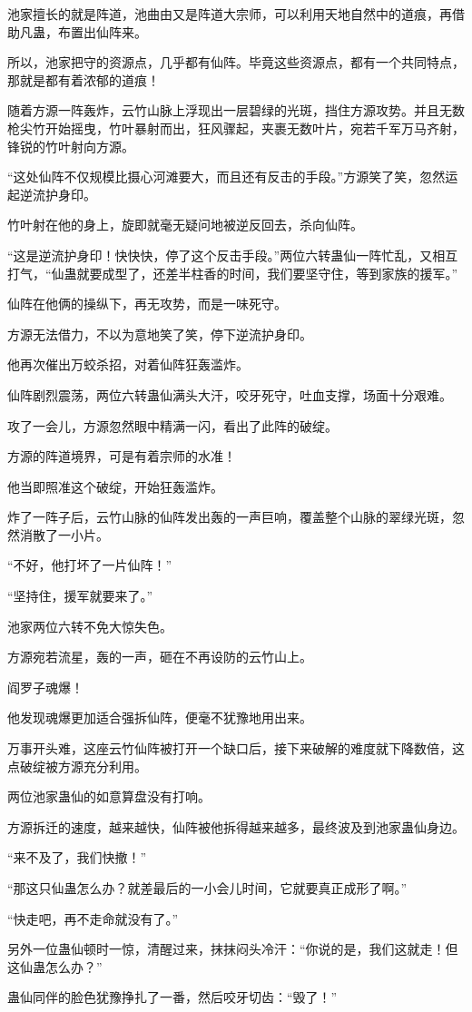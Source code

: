 \begin{this_body}
池家擅长的就是阵道，池曲由又是阵道大宗师，可以利用天地自然中的道痕，再借助凡蛊，布置出仙阵来。

所以，池家把守的资源点，几乎都有仙阵。毕竟这些资源点，都有一个共同特点，那就是都有着浓郁的道痕！

随着方源一阵轰炸，云竹山脉上浮现出一层碧绿的光斑，挡住方源攻势。并且无数枪尖竹开始摇曳，竹叶暴射而出，狂风骤起，夹裹无数叶片，宛若千军万马齐射，锋锐的竹叶射向方源。

“这处仙阵不仅规模比摄心河滩要大，而且还有反击的手段。”方源笑了笑，忽然运起逆流护身印。

竹叶射在他的身上，旋即就毫无疑问地被逆反回去，杀向仙阵。

“这是逆流护身印！快快快，停了这个反击手段。”两位六转蛊仙一阵忙乱，又相互打气，“仙蛊就要成型了，还差半柱香的时间，我们要坚守住，等到家族的援军。”

仙阵在他俩的操纵下，再无攻势，而是一味死守。

方源无法借力，不以为意地笑了笑，停下逆流护身印。

他再次催出万蛟杀招，对着仙阵狂轰滥炸。

仙阵剧烈震荡，两位六转蛊仙满头大汗，咬牙死守，吐血支撑，场面十分艰难。

攻了一会儿，方源忽然眼中精满一闪，看出了此阵的破绽。

方源的阵道境界，可是有着宗师的水准！

他当即照准这个破绽，开始狂轰滥炸。

炸了一阵子后，云竹山脉的仙阵发出轰的一声巨响，覆盖整个山脉的翠绿光斑，忽然消散了一小片。

“不好，他打坏了一片仙阵！”

“坚持住，援军就要来了。”

池家两位六转不免大惊失色。

方源宛若流星，轰的一声，砸在不再设防的云竹山上。

阎罗子魂爆！

他发现魂爆更加适合强拆仙阵，便毫不犹豫地用出来。

万事开头难，这座云竹仙阵被打开一个缺口后，接下来破解的难度就下降数倍，这点破绽被方源充分利用。

两位池家蛊仙的如意算盘没有打响。

方源拆迁的速度，越来越快，仙阵被他拆得越来越多，最终波及到池家蛊仙身边。

“来不及了，我们快撤！”

“那这只仙蛊怎么办？就差最后的一小会儿时间，它就要真正成形了啊。”

“快走吧，再不走命就没有了。”

另外一位蛊仙顿时一惊，清醒过来，抹抹闷头冷汗：“你说的是，我们这就走！但这仙蛊怎么办？”

蛊仙同伴的脸色犹豫挣扎了一番，然后咬牙切齿：“毁了！”

\end{this_body}

